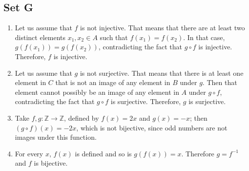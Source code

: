 \subsection{Set G}
\begin{enumerate}
    \item Let us assume that $f$ is not injective. That means that there are at least two distinct elements $x_1, x_2 \in A$ such that $f(x_1) = f(x_2)$. In that case, $g(f(x_1)) = g(f(x_2))$, contradicting the fact that $g \circ f$ is injective. Therefore, $f$ is injective.

    \item Let us assume that $g$ is not surjective. That means that there is at least one element in $C$ that is not an image of any element in $B$ under $g$. Then that element cannot possibly be an image of any element in $A$ under $g \circ f$, contradicting the fact that $g \circ f$ is surjective. Therefore, $g$ is surjective.

    \item Take $f, g: \mathbb{Z} \to \mathbb{Z}$, defined by $f(x) = 2x$ and $g(x) = -x$; then $(g \circ f)(x) = -2x$, which is not bijective, since odd numbers are not images under this function.

    \item For every $x$, $f(x)$ is defined and so is $g(f(x)) = x$. Therefore $g = f^{-1}$ and $f$ is bijective.
\end{enumerate}

